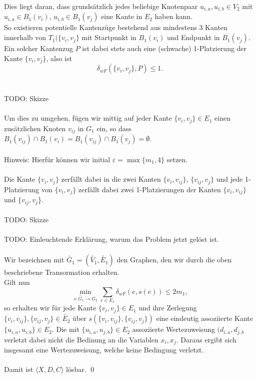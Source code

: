 \documentclass[a4paper, 12pt, twoside]{article}
\theoremstyle{Format1} %
\begin{document}
Dies liegt daran, dass grundsätzlich jedes beliebige Knotenpaar $u_{i,a}, u_{i,b} \in V_2$ mit $u_{i,a} \in B_1(v_i)$, $u_{i,b} \in B_1(v_j)$ eine Kante in $E_2$ haben kann.
\\
So existieren potentielle Kantenzüge bestehend aus mindestens 3 Kanten innerhalb von $T_1(\{v_i, v_j\}$ mit Startpunkt in $B_1(v_i)$ und Endpunkt in $B_1(v_j)$.
Ein solcher Kantenzug $P$ ist dabei stets auch eine (schwache) 1-Platzierung der Kante $\{v_i, v_j\}$, also ist
$$ \delta_{wF}(\{v_i, v_j\}, P) \leq 1.$$
\\
\\
TODO: Skizze
\\
\\
Um dies zu umgehen, fügen wir mittig auf jeder Kante $\{v_i, v_j\} \in E_1$ einen zusätzlichen Knoten $v_{ij}$ in $G_1$ ein,
so dass $B_1(v_{ij}) \cap B_1(v_i) = B_1(v_{ij}) \cap B_1(v_j) = \emptyset$.
\\
\\
Hinweis: Hierfür können wir initial $\varepsilon = \max \{m_1, 4\}$ setzen.
\\
\\
Die Kante $\{v_i, v_j\}$ zerfällt dabei in die zwei Kanten $\{v_i, v_{ij}\}$, $\{v_{ij},v_j\}$ und
jede 1-Platzierung von $\{v_i, v_j\}$ zerfällt dabei zwei 1-Platzierungen der Kanten $\{v_i, v_{ij}\}$ und $\{v_{ij}, v_j$\}.
\\
\\
TODO: Skizze
\\
\\
TODO: Einleuchtende Erklärung, warum das Problem jetzt gelöst ist.
\\
\\
Wir bezeichnen mit $\tilde{G_1}=(\tilde{V_1}, \tilde{E_1})$ den Graphen, den wir durch die oben beschriebene Transormation erhalten.
\\
Gilt nun
$$ \min_{s: \tilde{G_1} \to G_2} \sum_{e \in E_1} \delta_{wF}(e, s(e)) \leq 2m_1, $$
so erhalten wir für jede Kante $\{v_i, v_j\} \in E_1$ und ihre Zerlegung $\{v_i, v_{ij}\},\{v_{ij}, v_j\} \in \tilde{E_2}$
über $s(\{v_i, v_{ij}\},\{v_{ij}, v_j\})$ eine eindeutig assoziierte Kante $\{u_{i,a}, u_{i,b}\} \in E_2$.
Die mit $\{u_{i,a}, u_{j,b}\} \in E_2$ assoziierte Wertezuweisung $(d_{i,a}, d_{j,b}$ verletzt dabei nicht die Bedinung an die Variablen $x_i, x_j$.
Daraus ergibt sich insgesamt eine Wertezuweisung, welche keine Bedingung verletzt.
\\
\\
Damit ist $\langle X,D,C \rangle$ lösbar. \qed
\\
\end{document}
